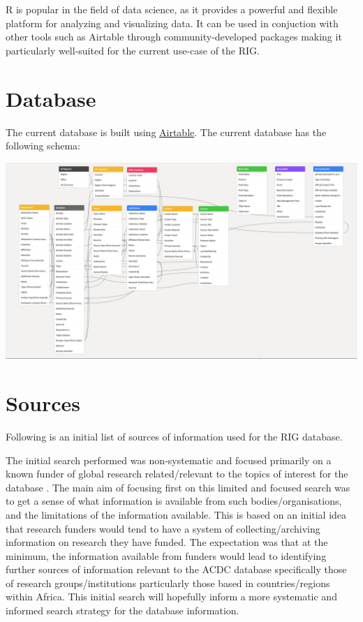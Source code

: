 \documentclass[
]{book}
\begin{document}
R is popular in the field of data science, as it provides a powerful and flexible platform for analyzing and visualizing data. It can be used in conjuction with other tools such as Airtable through community-developed packages making it particularly well-suited for the current use-case of the RIG.

\hypertarget{database}{%
\chapter{Database}\label{database}}

The current database is built using \href{https://airtable.com}{Airtable}. The current database has the following schema:

\includegraphics{images/database_schema.png}

\hypertarget{sources}{%
\chapter{Sources}\label{sources}}

Following is an initial list of sources of information used for the RIG database.

The initial search performed was non-systematic and focused primarily on a known funder of global research related/relevant to the topics of interest for the database . The main aim of focusing first on this limited and focused search was to get a sense of what information is available from such bodies/organisations, and the limitations of the information available. This is based on an initial idea that research funders would tend to have a system of collecting/archiving information on research they have funded. The expectation was that at the minimum, the information available from funders would lead to identifying further sources of information relevant to the ACDC database specifically those of research groups/institutions particularly those based in countries/regions within Africa. This initial search will hopefully inform a more systematic and informed search strategy for the database information.
\end{document}
